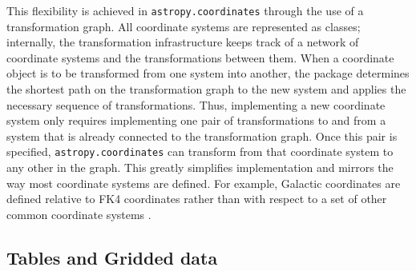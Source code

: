 \documentclass[traditabstract]{aa}
\begin{document}
This flexibility is achieved in \texttt{astropy.coordinates} through the use
of a transformation graph. All coordinate systems are represented as classes;
internally, the transformation infrastructure keeps track of a network of
coordinate systems and the transformations between them. When a coordinate
object is to be transformed from one system into another, the package
determines the shortest path on the transformation graph to the new system and
applies the necessary sequence of transformations. Thus, implementing a new
coordinate system only requires implementing one pair of transformations to
and from a system that is already connected to the transformation graph. Once
this pair is specified, \texttt{astropy.coordinates} can transform from that
coordinate system to any other in the graph. This greatly simplifies
implementation and mirrors the way most coordinate systems are defined. For
example, Galactic coordinates are defined relative to FK4 coordinates rather
than with respect to a set of other common coordinate systems
\citep{galcoords, reid04}.

\subsection{Tables and Gridded data}


\label{sec:table}
\end{document}
